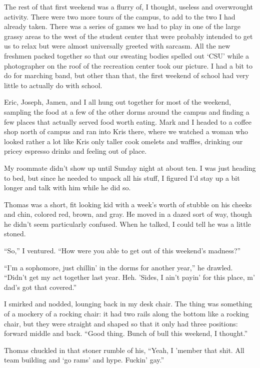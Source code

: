 The rest of that first weekend was a flurry of, I thought, useless and overwrought activity.  There were two more tours of the campus, to add to the two I had already taken.  There was a series of games we had to play in one of the large grassy areas to the west of the student center that were probably intended to get us to relax but were almost universally greeted with sarcasm.  All the new freshmen packed together so that our sweating bodies spelled out `CSU' while a photographer on the roof of the recreation center took our picture.  I had a bit to do for marching band, but other than that, the first weekend of school had very little to actually do with school.

Eric, Joseph, Jamen, and I all hung out together for most of the weekend, sampling the food at a few of the other dorms around the campus and finding a few places that actually served food worth eating.  Mark and I headed to a coffee shop north of campus and ran into Kris there, where we watched a woman who looked rather a lot like Kris only taller cook omelets and waffles, drinking our pricey espresso drinks and feeling out of place.

My roommate didn't show up until Sunday night at about ten.  I was just heading to bed, but since he needed to unpack all his stuff, I figured I'd stay up a bit longer and talk with him while he did so.

Thomas was a short, fit looking kid with a week's worth of stubble on his cheeks and chin, colored red, brown, and gray.  He moved in a dazed sort of way, though he didn't seem particularly confused.  When he talked, I could tell he was a little stoned.

``So,'' I ventured.  ``How were you able to get out of this weekend's madness?''

``I'm a sophomore, just chillin' in the dorms for another year,'' he drawled.  ``Didn't get my act together last year.  Heh.  'Sides, I ain't payin' for this place, m' dad's got that covered.''

I smirked and nodded, lounging back in my desk chair.  The thing was something of a mockery of a rocking chair: it had two rails along the bottom like a rocking chair, but they were straight and shaped so that it only had three positions: forward middle and back.  ``Good thing.  Bunch of bull this weekend, I thought.''

Thomas chuckled in that stoner rumble of his, ``Yeah, I 'member that shit.  All team building and `go rams' and hype.  Fuckin' gay.''

